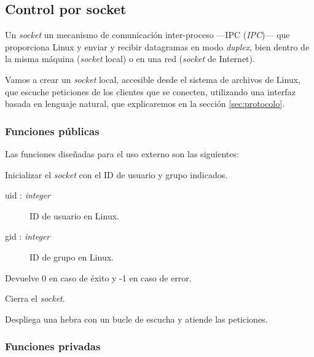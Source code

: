 \smallskip

\subsection{Control por socket}
\label{subsec:daemon}

Un \textit{socket} un mecanismo de comunicación inter-proceso ---\acrshort{IPC} (\textit{\acrlong{IPC}})--- que proporciona Linux y enviar y recibir datagramas en modo \textit{duplex}, bien dentro de la misma máquina (\textit{socket} local) o en una red (\textit{socket} de Internet).

Vamos a crear un \textit{socket} local, accesible desde el sistema de archivos de Linux, que escuche peticiones de los clientes que se conecten, utilizando una interfaz basada en lenguaje natural, que explicaremos en la sección \ref{sec:protocolo}.

\subsubsection{Funciones públicas}

Las funciones diseñadas para el uso externo son las siguientes:

\begin{description}[style=nextline]
	\item[socket\_init (uid, gid) : \textit{integer}]
	Inicializar el \textit{socket} con el ID de usuario y grupo indicados.
	
	\begin{description}
		\item[uid : \textit{integer}] ID de usuario en Linux.
		\item[gid : \textit{integer}] ID de grupo en Linux.
	\end{description}
	
	Devuelve 0 en caso de éxito y -1 en caso de error.
	
	\item[socket\_destroy ()]
	Cierra el \textit{socket}.
	
	\item[socket\_loop ()]
	Despliega una hebra con un bucle de escucha y atiende las peticiones.
	
\end{description}

\subsubsection{Funciones privadas}

